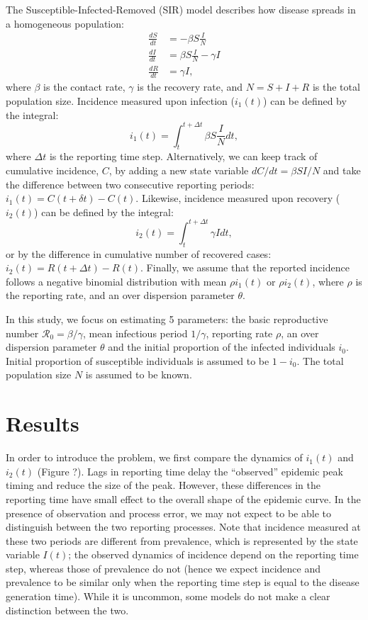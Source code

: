 \documentclass{article}\usepackage[]{graphicx}\usepackage[]{color}
\begin{document}
The Susceptible-Infected-Removed (SIR) model describes how disease spreads in a
homogeneous population:
\begin{equation}
\begin{aligned}
\frac{dS}{dt} &= - \beta S \frac{I}{N}\\
\frac{dI}{dt} &= \beta S \frac{I}{N} - \gamma I\\
\frac{dR}{dt} &= \gamma I,
\end{aligned}
\end{equation}
where $\beta$ is the contact rate, $\gamma$ is the recovery rate, and $N = S + I + R$ is
the total population size. Incidence measured upon infection ($i_1(t)$) can be
defined by the integral:
\begin{equation}
i_1(t) = \int_{t}^{t + \Delta t} \beta S \frac{I}{N} dt,
\end{equation}
where $\Delta t$ is the reporting time step.
Alternatively, we can keep track of cumulative incidence, $C$, by adding a 
new state variable $dC/dt = \beta S I/N$ and take the difference between 
two consecutive reporting periods: $i_1(t) = C(t+\delta t) - C(t)$. Likewise, 
incidence measured upon recovery ($i_2(t)$) can be defined by the integral:
\begin{equation}
i_2(t) = \int_{t}^{t + \Delta t} \gamma I dt,
\end{equation}
or by the difference in cumulative number of recovered cases: $i_2(t) = R(t + \Delta t) - R(t)$.
Finally, we assume that the reported incidence follows a negative binomial 
distribution with mean $\rho i_1(t)$ or $\rho i_2(t)$, where $\rho$ is the 
reporting rate, and an over dispersion parameter $\theta$.

In this study, we focus on estimating 5 parameters: the basic reproductive
number $\mathcal R_0 = \beta/\gamma$, mean infectious period $1/\gamma$, 
reporting rate $\rho$, an over dispersion parameter $\theta$ and the initial
proportion of the infected individuals $i_0$. Initial proportion of
susceptible individuals is assumed to be $1 - i_0$. The total population
size $N$ is assumed to be known.

\section{Results}

In order to introduce the problem, we first compare the dynamics of $i_1(t)$ and
$i_2(t)$ (Figure ?). Lags in reporting time delay the ``observed'' epidemic peak 
timing and reduce the size of the peak. However, these differences in the reporting
time have small effect to the overall shape of the epidemic curve. In the presence
of observation and process error, we may not expect to be able to distinguish between
the two reporting processes. Note that incidence measured at these two periods are 
different from prevalence, which is represented by the state variable $I(t)$; the
observed dynamics of incidence depend on the reporting time step, whereas those of
prevalence do not (hence we expect incidence and prevalence to be similar only when
the reporting time step is equal to the disease generation time). While it is
uncommon, some models do not make a clear distinction between the two.
\end{document}

